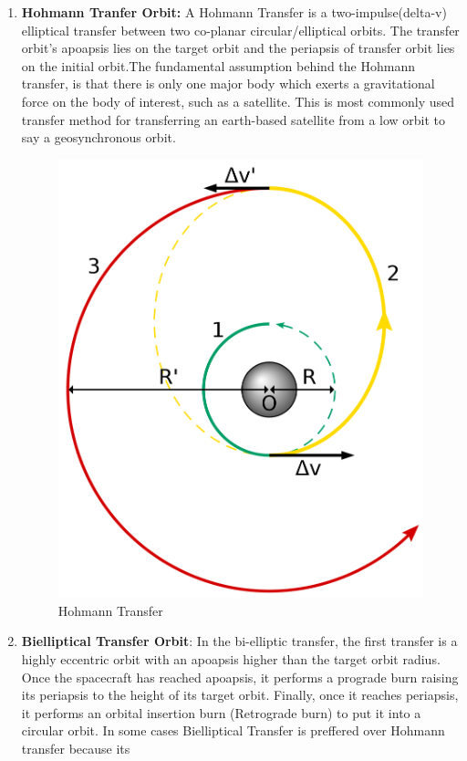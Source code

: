 \begin{enumerate}
\item \textbf{Hohmann Tranfer Orbit: }A Hohmann Transfer is a two-impulse(delta-v) elliptical transfer between two co-planar circular/elliptical orbits. The transfer orbit's apoapsis lies on the target orbit and the periapsis of transfer orbit lies on the initial orbit.The fundamental assumption behind the Hohmann transfer, is that there is only one major body which exerts a gravitational force on the body of interest, such as a satellite. This is most commonly used transfer method for transferring an earth-based satellite from a low orbit to say a geosynchronous orbit.
\begin{figure}[H]
\includegraphics[scale=0.2]{images/ht.png}
\caption{Hohmann Transfer}
\end{figure}
\item \textbf{Bielliptical Transfer Orbit}: In the bi-elliptic transfer, the first transfer is a highly eccentric orbit with an apoapsis higher than the target orbit radius. Once the spacecraft has reached apoapsis, it performs a prograde burn raising its periapsis to the height of its target orbit. Finally, once it reaches periapsis, it performs an orbital insertion burn (Retrograde burn) to put it into a circular orbit. In some cases Bielliptical Transfer is preffered over Hohmann transfer because its

\end{enumerate}
